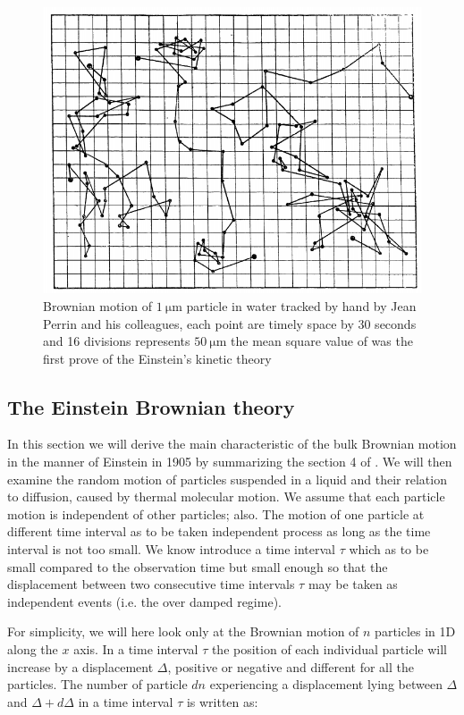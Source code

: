 \begin{figure}[h]
	\centering
	\includegraphics[scale=0.6]{02_body/chapter1/image/graph_perrin.png}
	\caption{Brownian motion of $1 ~ \mathrm{\mu m}$ particle in water tracked by hand by Jean Perrin and his colleagues, each point are timely space by 30 seconds and 16 divisions represents $50 ~ \mathrm{\mu m}$  the mean square value of was the first prove of the Einstein's kinetic theory}
	\label{fig:Perrin_Brownian}
\end{figure}

\subsection{The Einstein Brownian theory}

In this section we will derive the main characteristic of the bulk Brownian motion in the manner of Einstein in 1905 by summarizing the section 4 of \cite{einstein_uber_1905}. We will then examine  the random motion of particles suspended in a liquid and their relation to diffusion, caused by thermal molecular motion. We assume that each particle motion is independent of other particles; also. The motion of one particle at different time interval as to be taken independent process as long as the time interval is not too small. We know introduce a time interval $\tau$ which as to be small compared to the observation time but small enough so that  the displacement between two consecutive time intervals $\tau$ may be taken as independent events (i.e. the over damped regime). 

For simplicity, we will here look only at the Brownian motion of $n$ particles in 1D along the $x$ axis. In a time interval $\tau$ the position of each individual particle will increase by a displacement $\Delta$, positive or negative and different for all the particles. The number of particle $dn$ experiencing a displacement lying between $\Delta$ and $\Delta + d\Delta$ in a time interval $\tau$ is written as:

